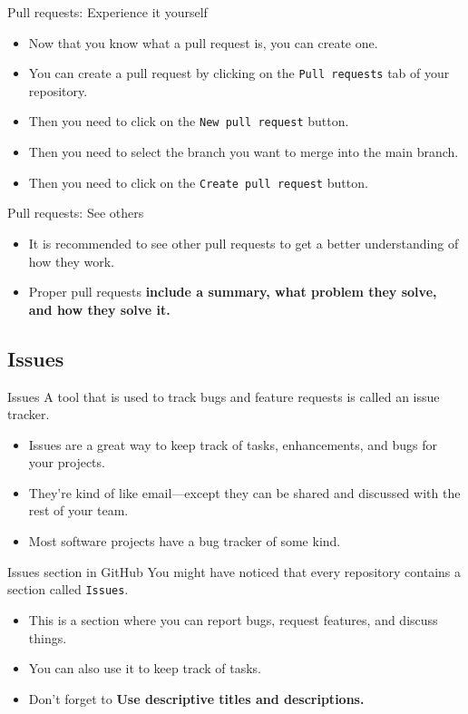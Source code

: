 \documentclass{beamer}
\begin{document}
\begin{frame}{Pull requests: Experience it yourself}
    \begin{itemize}
        \item Now that you know what a pull request is, you can create one.
        \item You can create a pull request by clicking on the \texttt{Pull requests} tab of your repository.
        \item Then you need to click on the \texttt{New pull request} button.
        \item Then you need to select the branch you want to merge into the main branch.
        \item Then you need to click on the \texttt{Create pull request} button.
    \end{itemize}
\end{frame}

\begin{frame}{Pull requests: See others}
    \begin{itemize}
        \item It is recommended to see other pull requests to get a better understanding of how they work.
        \item Proper pull requests \textbf{include a summary, what problem they solve, and how they solve it.}
    \end{itemize}
\end{frame}

\subsection{Issues}

\begin{frame}{Issues}
    A tool that is used to track bugs and feature requests is called an issue tracker.

    \begin{itemize}
        \item Issues are a great way to keep track of tasks, enhancements, and bugs for your projects.
        \item They're kind of like email—except they can be shared and discussed with the rest of your team.
        \item Most software projects have a bug tracker of some kind.
    \end{itemize}
\end{frame}

\begin{frame}{Issues section in GitHub}
    You might have noticed that every repository contains a section called \texttt{Issues}.
    \begin{itemize}
        \item This is a section where you can report bugs, request features, and discuss things.
        \item You can also use it to keep track of tasks.
        \item Don't forget to \textbf{Use descriptive titles and descriptions.}
    \end{itemize}
\end{frame}
\end{document}
